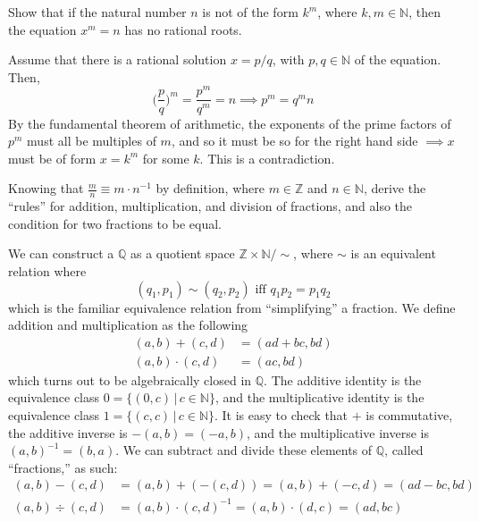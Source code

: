   \begin{exercise}[Zorich 2.2.9]
    Show that if the natural number $n$ is not of the form $k^m$, where $k, m \in \mathbb{N}$, then the equation $x^m = n$ has no rational roots. 
  \end{exercise}
  \begin{solution}
    Assume that there is a rational solution $x = p/q$, with $p, q \in \mathbb{N}$ of the equation. Then, 
    \begin{equation}
      \bigg( \frac{p}{q}\bigg)^m = \frac{p^m}{q^m} = n \implies p^m = q^m n
    \end{equation}
    By the fundamental theorem of arithmetic, the exponents of the prime factors of $p^m$ must all be multiples of $m$, and so it must be so for the right hand side $\implies x$ must be of form $x = k^m$ for some $k$. This is a contradiction. 
  \end{solution}

  \begin{exercise}[Zorich 2.2.12]
    Knowing that $\frac{m}{n} \equiv m \cdot n^{-1}$ by definition, where $m \in \mathbb{Z}$ and $n \in \mathbb{N}$, derive the ``rules'' for addition, multiplication, and division of fractions, and also the condition for two fractions to be equal. 
  \end{exercise}
  \begin{solution}
    We can construct a $\mathbb{Q}$ as a quotient space $\mathbb{Z} \times \mathbb{N} / \sim$, where $\sim$ is an equivalent relation where 
    \begin{equation}
      (q_1, p_1) \sim (q_2 , p_2) \text{ iff } q_1 p_2 = p_1 q_2
    \end{equation}
    which is the familiar equivalence relation from ``simplifying'' a fraction. We define addition and multiplication as the following 
    \begin{align*}
      (a, b) + (c, d) & = (ad + bc, bd) \\
      (a, b) \cdot (c, d) & = (ac, bd) 
    \end{align*}
    which turns out to be algebraically closed in $\mathbb{Q}$. The additive identity is the equivalence class $0 = \{(0, c) \,|\, c \in \mathbb{N}\}$, and the multiplicative identity is the equivalence class $1 = \{(c, c) \,|\, c \in \mathbb{N}\}$. It is easy to check that $+$ is commutative, the additive inverse is $-(a, b) = (-a, b)$, and the multiplicative inverse is $(a, b)^{-1} = (b, a)$. We can subtract and divide these elements of $\mathbb{Q}$, called ``fractions,'' as such: 
    \begin{align*}
      (a, b) - (c, d) & = (a, b) + (-(c, d)) = (a, b) + (-c, d) = (ad - bc, bd) \\
      (a, b) \div (c, d) & = (a, b) \cdot (c, d)^{-1} = (a, b) \cdot (d, c) = (ad, bc) 
    \end{align*}
  \end{solution}

